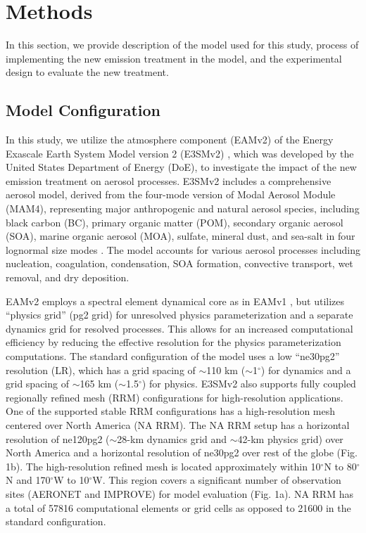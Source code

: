\section{Methods}
In this section, we provide description of the model used for this study, process of implementing the new emission treatment in the model, and the experimental design to evaluate the new treatment.

\subsection{Model Configuration}
In this study, we utilize the atmosphere component (EAMv2) of the Energy Exascale Earth System Model version 2 (E3SMv2) \citep{golaz2022doe}, which was developed by the United States Department of Energy (DoE), to investigate the impact of the new emission treatment on aerosol processes. E3SMv2 includes a comprehensive aerosol model, derived from the four-mode version of Modal Aerosol Module (MAM4), representing major anthropogenic and natural aerosol species, including black carbon (BC), primary organic matter (POM), secondary organic aerosol (SOA), marine organic aerosol (MOA), sulfate, mineral dust, and sea-salt in four lognormal size modes \citep{wang2020aerosols,liu2016description}. The model accounts for various aerosol processes including nucleation, coagulation, condensation, SOA formation, convective transport, wet removal, and dry deposition.

EAMv2 employs a spectral element dynamical core as in EAMv1 \citep{taylor2010compatible,dennis2012cam}, but utilizes “physics grid” (pg2 grid) for unresolved physics parameterization and a separate dynamics grid for resolved processes. This allows for an increased computational efficiency by reducing the effective resolution for the physics parameterization computations. The standard configuration of the model uses a low “ne30pg2” resolution (LR), which has a grid spacing of $\sim$110 km ($\sim$1$^{\circ}$) for dynamics and a grid spacing of $\sim$165 km ($\sim$1.5$^{\circ}$) for physics. E3SMv2 also supports fully coupled regionally refined mesh (RRM) configurations for high-resolution applications. One of the supported stable RRM configurations has a high-resolution mesh centered over North America (NA RRM). The NA RRM setup has a horizontal resolution of ne120pg2 ($\sim$28-km dynamics grid and $\sim$42-km physics grid) over North America and a horizontal resolution of ne30pg2 over rest of the globe (Fig. 1b). The high-resolution refined mesh is located approximately within 10$^{\circ}$N to 80$^{\circ}$N and 170$^{\circ}$W to 10$^{\circ}$W. This region covers a significant number of observation sites (AERONET and IMPROVE) for model evaluation (Fig. 1a). NA RRM has a total of 57816 computational elements or grid cells as opposed to 21600 in the standard configuration.

